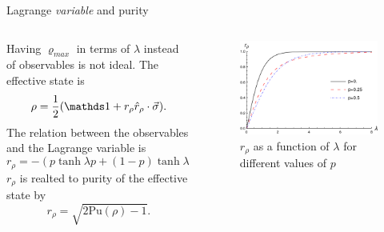 \begin{frame}{Lagrange \textit{variable} and purity}
    \begin{columns}
        \begin{column}{0.5\textwidth}
            Having $\varrho_{max}$ in terms of $\lambda$ instead of observables is not ideal. The effective state is
            \begin{equation*}
                \rho=\frac{1}{2}(\Id+r_{\rho}\hat{r}_{\rho}\cdot\vec{\sigma}).
            \end{equation*}
            The relation between the observables and the Lagrange variable is
            \begin{equation*}
                r_{\rho}=-(p\tanh{\lambda p}+(1-p)\tanh{\lambda (1-p)}).
            \end{equation*}
            $r_{\rho}$ is realted to purity of the effective state by
            \begin{equation*}
                r_{\rho}=\sqrt{2\text{Pu}(\rho)-1}.
            \end{equation*}
        \end{column}
        \begin{column}{0.5\textwidth}
            \begin{figure}[h!]
                \includegraphics[width=0.8\columnwidth]{figures/r(lambda).png}%
                \caption{$r_{\rho}$ as a function of $\lambda$ for different values of $p$}
            \end{figure}
        \end{column}
    \end{columns}
\end{frame}
